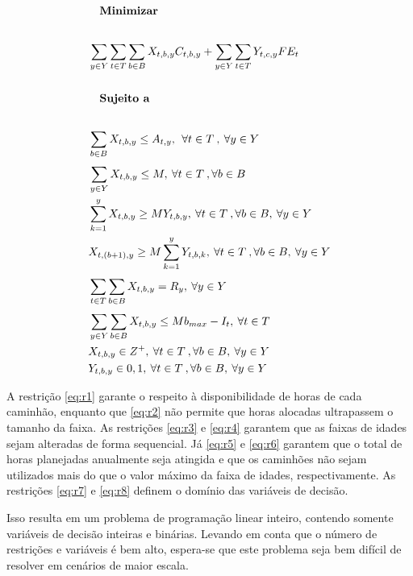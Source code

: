 \documentclass[conference]{IEEEtran}
\begin{document}
\begin{align}
  & \quad \text{\textbf{Minimizar}} \nonumber \\ \nonumber \\
  &  \sum_{y \in Y}^{}\sum_{t \in T}^{}\sum_{b \in B}^{}X_{t,b,y}C_{t,b,y} + \sum_{y \in Y}^{}\sum_{t \in T}^{}Y_{t,c,y}FE_t  \\ \nonumber \\
 & \quad \text{\textbf{Sujeito a}} \nonumber \\ \nonumber \\
 & \sum_{b \in B}^{}X_{t,b,y} \leq A_{t,y},\: \: \forall t \in T \:, \: \forall y\in Y \label{eq:r1}\\
 & \sum_{y \in Y}^{}X_{t,b,y} \leq M,\: \forall t \in T \:, \forall b \in B \label{eq:r2} \\
 & \sum_{k=1}^{y}X_{t,b,y} \geq MY_{t,b,y},\: \forall t \in T \:, \forall b \in B, \: \forall y\in Y \label{eq:r3} \\
 & X_{t,(b+1),y} \geq M \sum_{k=1}^{y}Y_{t,b,k},\: \forall t \in T \:, \forall b \in B, \: \forall y\in Y \label{eq:r4} \\
 & \sum_{t \in T}^{}\sum_{b \in B}^{}X_{t,b,y} = R_y ,\: \forall y \in Y \label{eq:r5} \\
 & \sum_{y \in Y}^{}\sum_{b \in B}^{}X_{t,b,y} \leq Mb_{max} - I_t ,\: \forall t \in T \label{eq:r6} \\
 & X_{t,b,y} \in \mathnormal{Z^+},\: \forall t \in T \:, \forall b \in B, \: \forall y\in Y \label{eq:r7} \\
 & Y_{t,b,y} \in {0,1},\: \forall t \in T \:, \forall b \in B, \: \forall y\in Y \label{eq:r8}
\end{align}

A restrição \ref{eq:r1} garante o respeito à disponibilidade de horas de cada caminhão, enquanto que \ref{eq:r2} não permite que horas alocadas ultrapassem o tamanho da faixa. As restrições \ref{eq:r3} e \ref{eq:r4} garantem que as faixas de idades sejam alteradas de forma sequencial. Já \ref{eq:r5} e \ref{eq:r6} garantem que o total de horas planejadas anualmente seja atingida e que os caminhões não sejam utilizados mais do que o valor máximo da faixa de idades, respectivamente. As restrições \ref{eq:r7} e \ref{eq:r8} definem o domínio das variáveis de decisão.

Isso resulta em um problema de programação linear inteiro, contendo somente variáveis de decisão inteiras e binárias. Levando em conta que o número de restrições e variáveis é bem alto, espera-se que este problema seja bem difícil de resolver em cenários de maior escala. 
\end{document}
